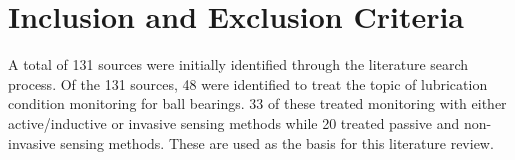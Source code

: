 
\section{Inclusion and Exclusion Criteria}

A total of 131 sources were initially identified through the literature search process. Of the 131 sources, 48 were identified to treat the topic of lubrication condition monitoring for ball bearings. 33 of these treated monitoring with either active/inductive or invasive sensing methods while 20 treated passive and non-invasive sensing methods. These are used as the basis  for this literature review.